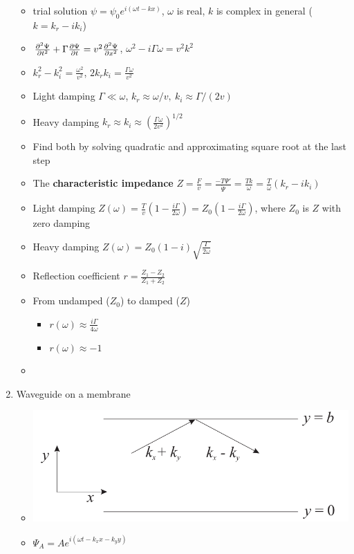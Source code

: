 \documentclass{article}
\theoremstyle{remark}
\theoremstyle{remark}
\begin{document}
\begin{enumerate}
\begin{itemize}
        \item trial solution $\psi=\psi_0 e^{i(\omega t-kx)}$, $\omega$ is real, $k$ is complex in general ($k=k_r-ik_i$)
        \item $\pdv[2]{\Psi}{t} + \Gamma\pdv{\Psi}{t}=v^2\pdv[2]{\Psi}{x}$, $\omega^2-i\Gamma\omega = v^2k^2$
        \item $k_r^2-k_i^2 = \frac{\omega^2}{v^2}$, $2k_rk_i = \frac{\Gamma\omega}{v^2}$
        \item Light damping $\Gamma\ll\omega$, $k_r\approx\omega/v,\ k_i\approx\Gamma/(2v)$
        \item Heavy damping $k_r\approx k_i\approx\left(\frac{\Gamma\omega}{2v^2}\right)^{1/2}$
        \item Find both by solving quadratic and approximating square root at the last step
        \item The \textbf{characteristic impedance} $Z=\frac{F}{v}=\frac{-T\Psi'}{\dot{\Psi}}=\frac{Tk}{\omega}=\frac{T}{\omega}(k_r-ik_i)$
        \item Light damping $Z(\omega)=\frac{T}{v}\left(1-\frac{i\Gamma}{2\omega}\right)=Z_0\left(1-\frac{i\Gamma}{2\omega}\right)$, where $Z_0$ is $Z$ with zero damping
        \item Heavy damping $Z(\omega)=Z_0(1-i)\sqrt{\frac{\Gamma}{2\omega}}$
        \item Reflection coefficient $r=\frac{Z_1-Z_2}{Z_1+Z_2}$
        \item From undamped ($Z_0$) to damped ($Z$)\begin{itemize}
                \item $r(\omega)\approx\frac{i\Gamma}{4\omega}$
                \item $r(\omega)\approx-1$
            \end{itemize}
            \item 
        \end{itemize}
    \item Waveguide on a membrane\begin{itemize}
            \item \includegraphics*[width=0.6\linewidth]{membrane_waveguide.png}
            \item $\Psi_A=Ae^{i(\omega t-k_x x-k_y y)}$

\end{itemize}
\end{enumerate}
\end{document}
